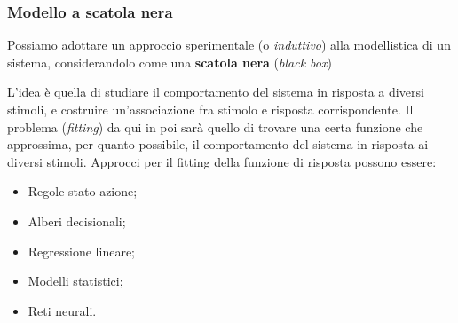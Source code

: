\documentclass[a4paper,11pt]{article}
\begin{document}
\subsubsection{Modello a scatola nera}
Possiamo adottare un approccio sperimentale (o \textit{induttivo}) alla modellistica di un sistema, considerandolo come una \textbf{scatola nera} (\textit{black box}) 

\begin{center}
\end{center}

L'idea è quella di studiare il comportamento del sistema in risposta a diversi stimoli, e costruire un'associazione fra stimolo e risposta corrispondente.
Il problema (\textit{fitting}) da qui in poi sarà quello di trovare una certa funzione che approssima, per quanto possibile, il comportamento del sistema in risposta ai diversi stimoli.
Approcci per il fitting della funzione di risposta possono essere:
\begin{itemize}
	\item Regole stato-azione;
	\item Alberi decisionali;
	\item Regressione lineare;
	\item Modelli statistici;
	\item Reti neurali.
\end{itemize}
\end{document}
